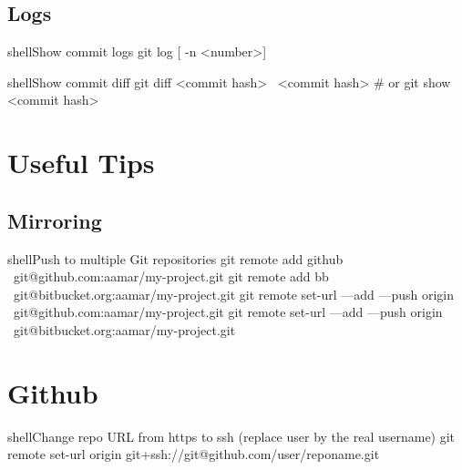 \documentclass[10pt,a4paper]{article}
\begin{document}
\begin{multicols}{3}
\subsection{Logs}

\begin{codebox}{shell}{Show commit logs}
git log [ -n <number>]

\end{codebox}

\begin{codebox}{shell}{Show commit diff}
git diff <commit hash>~   <commit hash>
# or 
 git show <commit hash>

\end{codebox}

{\centering\section{Useful Tips}}

\subsection{Mirroring}

\begin{codebox}{shell}{Push to multiple Git repositories}
git remote add github \
      git@github.com:aamar/my-project.git 
git remote add bb \ 
      git@bitbucket.org:aamar/my-project.git 
git remote set-url ---add ---push origin \
      git@github.com:aamar/my-project.git
git remote set-url ---add ---push origin \
      git@bitbucket.org:aamar/my-project.git

\end{codebox}

{\centering\section{Github}}

\begin{codebox}{shell}{Change repo URL from https to ssh (replace user by the real username)}
git remote set-url origin git+ssh://git@github.com/user/reponame.git

\end{codebox}


\AtNextBibliography{\footnotesize}
\printbibliography  
\end{multicols}
\end{document}
